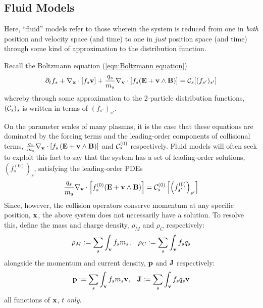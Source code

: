 \subsection*{Fluid Models}
    \begin{definition}
        Here, ``fluid'' models refer to those wherein the system is reduced from one in \emph{both} position and velocity space (and time) to one in \emph{just} position space (and time) through some kind of approximation to the distribution function.
    \end{definition}
    Recall the Boltzmann equation (\ref{eqn:Boltzmann equation})
    \begin{equation*}
        \partial_{t}f_{s} + \nabla_{\mathbf{x}}\cdot[f_{s}\mathbf{v}] + \frac{q_{s}}{m_{s}}\nabla_{\mathbf{v}}\cdot[f_{s}(\mathbf{E} + \mathbf{v}\wedge\mathbf{B})]  =  \mathcal{C}_{s}[(f_{s'})_{s'}]
    \end{equation*}
    whereby through some approximation to the 2-particle distribution functions, $(\mathcal{C}_{s})_{s}$ is written in terms of $(f_{s'})_{s'}$.
    
    On the parameter scales of many plasmas, it is the case that these equations are dominated by the forcing terms and the leading-order components of collisional terms, $\frac{q_{s}}{m_{s}}\nabla_{\mathbf{v}}\cdot[f_{s}\left(\mathbf{E} + \mathbf{v}\wedge\mathbf{B}\right)]$ and $\mathcal{C}_{s}^{(0)}$ respectively. Fluid models will often seek to exploit this fact to say that the system has a set of leading-order solutions, $\left(f_{s}^{(0)}\right)_{s}$, satisfying the leading-order PDEs
    \begin{equation}
        \frac{q_{s}}{m_{s}}\nabla_{\mathbf{v}}\cdot\left[f_{s}^{(0)}(\mathbf{E} + \mathbf{v}\wedge\mathbf{B})\right]  =  \mathcal{C}_{s}^{(0)}\left[\left(f_{s'}^{(0)}\right)_{s'}\right]
    \end{equation}
    Since, however, the collision operators conserve momentum at any specific position, $\mathbf{x}$, the above system does not necessarily have a solution. To resolve this, define the mass and charge density, $\rho_{M}$ and $\rho_{C}$ respectively:
    \begin{align}
        \rho_{M}  :=  \sum_{s}\int_{\mathbf{v}}f_{s}m_{s},  &&
        \rho_{C}  :=  \sum_{s}\int_{\mathbf{v}}f_{s}q_{s}
    \end{align}
    alongside the momentum and current density, $\mathbf{p}$ and $\mathbf{J}$ respectively:
    \begin{align}
        \mathbf{p}  :=  \sum_{s}\int_{\mathbf{v}}f_{s}m_{s}\mathbf{v},  &&
        \mathbf{J}  :=  \sum_{s}\int_{\mathbf{v}}f_{s}q_{s}\mathbf{v}
    \end{align}
    all functions of $\mathbf{x}$, $t$ \emph{only}.
    
